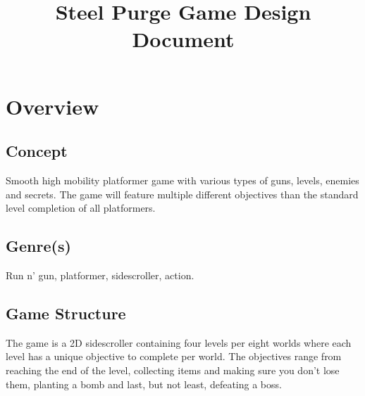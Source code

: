 \documentclass[12pt]{article}
\title{Steel Purge Game Design Document}
\begin{document}
\maketitle{}

\section{Overview}


\subsection{Concept}

Smooth high mobility platformer game with various types of guns, levels, enemies and secrets. The game will feature multiple different objectives than the standard level completion of all platformers. 

\subsection{Genre(s)}

Run n' gun, platformer, sidescroller, action.

\subsection{Game Structure}

The game is a 2D sidescroller containing four levels per eight worlds where each level has a unique objective to complete per world. The objectives range from reaching the end of the level, collecting items and making sure you don't lose them, planting a bomb and last, but not least, defeating a boss.

\end{document}
